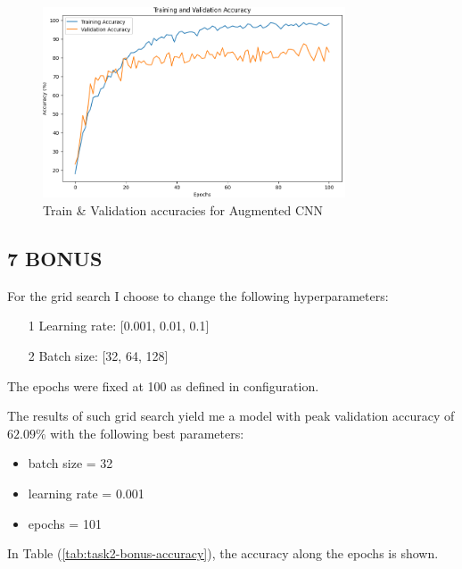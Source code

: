 \documentclass[11pt]{scrartcl}
\begin{document}
\begin{figure}[htbp]
\centering
\includegraphics[width=0.8\textwidth]{./figures/task2-aug-accuracy.png}
\caption{Train \& Validation accuracies for Augmented CNN}
\label{fig:task2-aug-accuracy}
\end{figure}


\subsection*{7 BONUS}

For the grid search I choose to change the following hyperparameters:
\begin{itemize}
	\item[1] Learning rate: [0.001, 0.01, 0.1]
	\item[2] Batch size: [32, 64, 128]
\end{itemize}

The epochs were fixed at 100 as defined in configuration.

The results of such grid search yield me a model with peak validation accuracy of
\( 62.09 \% \)
with the following best parameters:

\begin{itemize}
	\item batch size = 32
	\item learning rate = 0.001
	\item epochs = 101
\end{itemize}

In Table (\ref{tab:task2-bonus-accuracy}), the accuracy along the epochs is shown.
\end{document}
